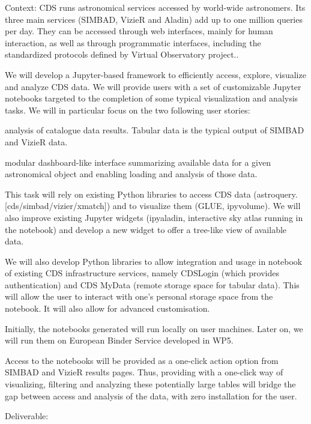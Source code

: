 \begin{task}[
  title=Astro application,
  id=astro,
  lead=CDS,
  PM=18,
  wphases={0-48},
  partners={CDS}
]

  Context: CDS runs astronomical services accessed by world-wide astronomers. 
Its three main services (SIMBAD, VizieR and Aladin) add up to one million
queries per day.  They can be accessed through web interfaces, mainly for human
interaction, as well as through programmatic interfaces, including the
standardized protocols defined by Virtual Observatory project..
    
  We will develop a Jupyter-based framework to efficiently access, explore, 
visualize and analyze CDS data. 
 We will provide users with a set of customizable Jupyter notebooks targeted
to the completion of some typical visualization and analysis tasks. We will
in particular focus on the two following user stories:
    \begin{compactitem}
        \item analysis of catalogue data results. Tabular data is the typical
              output of SIMBAD and VizieR data.
         \item modular dashboard-like interface summarizing available data
               for a given astronomical object and enabling loading and
               analysis of those data.
    \end{compactitem}


  This task will rely on existing Python libraries to access CDS data
(astroquery.[cds/simbad/vizier/xmatch]) and to visualize them (GLUE, ipyvolume).
We will also improve existing Jupyter widgets (ipyaladin, interactive sky atlas
running in the notebook) and develop a new widget to offer a tree-like view
of available data.
    
  We will also develop Python libraries to allow integration and usage in notebook of
existing CDS infrastructure services, namely CDSLogin (which provides
authentication) and CDS MyData (remote storage space for tabular data).
This will allow the user to interact with one's personal storage space from
the notebook. It will also allow for advanced customisation.
  
  Initially, the notebooks generated will run locally on user machines.
Later on, we will run them on European Binder Service developed in WP5.

  Access to the notebooks will be provided as a one-click action option from
SIMBAD and VizieR results pages.
  Thus, providing with a one-click way of visualizing, filtering and analyzing
these potentially large tables will bridge the gap between access and analysis
of the data, with zero installation for the user.

    Deliverable: 
\end{task}
